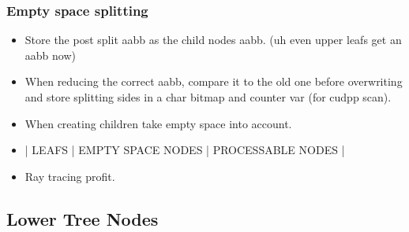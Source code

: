 \subsubsection{Empty space splitting}

\begin{itemize}
  \item Store the post split aabb as the child nodes aabb. (uh even
    upper leafs get an aabb now)
  \item When reducing the correct aabb, compare it to the old one
    before overwriting and store splitting sides in a char bitmap and counter var (for cudpp scan).
  \item When creating children take empty space into account.
  \item | LEAFS | EMPTY SPACE NODES | PROCESSABLE NODES |
  \item Ray tracing profit.
\end{itemize}

\subsection{Lower Tree Nodes}








